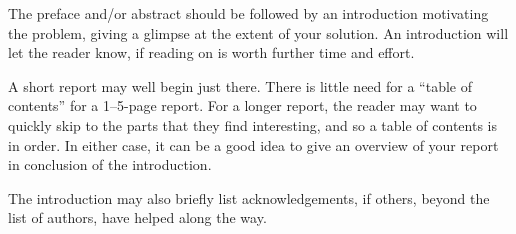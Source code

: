 The preface and/or abstract should be followed by an introduction motivating
the problem, giving a glimpse at the extent of your solution. An introduction
will let the reader know, if reading on is worth further time and effort.

A short report may well begin just there. There is little need for a ``table of
contents'' for a 1--5-page report. For a longer report, the reader may want to
quickly skip to the parts that they find interesting, and so a table of
contents is in order. In either case, it can be a good idea to give an overview
of your report in conclusion of the introduction.

The introduction may also briefly list acknowledgements, if others, beyond the
list of authors, have helped along the way.
















